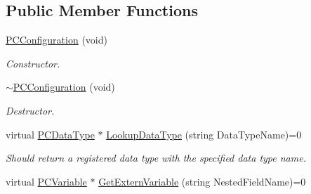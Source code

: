 \subsection*{Public Member Functions}
\begin{DoxyCompactItemize}
\item 
\hyperlink{classpc__emulator_1_1PCConfiguration_ae07e6861ec53d04f892c6bba07535c40}{P\+C\+Configuration} (void)\hypertarget{classpc__emulator_1_1PCConfiguration_ae07e6861ec53d04f892c6bba07535c40}{}\label{classpc__emulator_1_1PCConfiguration_ae07e6861ec53d04f892c6bba07535c40}

\begin{DoxyCompactList}\small\item\em Constructor. \end{DoxyCompactList}\item 
\hyperlink{classpc__emulator_1_1PCConfiguration_a0d52d8b4cca4b054e86a2d46eb4e0993}{$\sim$\+P\+C\+Configuration} (void)\hypertarget{classpc__emulator_1_1PCConfiguration_a0d52d8b4cca4b054e86a2d46eb4e0993}{}\label{classpc__emulator_1_1PCConfiguration_a0d52d8b4cca4b054e86a2d46eb4e0993}

\begin{DoxyCompactList}\small\item\em Destructor. \end{DoxyCompactList}\item 
virtual \hyperlink{classpc__emulator_1_1PCDataType}{P\+C\+Data\+Type} $\ast$ \hyperlink{classpc__emulator_1_1PCConfiguration_a432b83c94b6c378cbff6e09d9adbab71}{Lookup\+Data\+Type} (string Data\+Type\+Name)=0
\begin{DoxyCompactList}\small\item\em Should return a registered data type with the specified data type name. \end{DoxyCompactList}\item 
virtual \hyperlink{classpc__emulator_1_1PCVariable}{P\+C\+Variable} $\ast$ \hyperlink{classpc__emulator_1_1PCConfiguration_a59c7d1158449f54b369e28e22a921d0e}{Get\+Extern\+Variable} (string Nested\+Field\+Name)=0\hypertarget{classpc__emulator_1_1PCConfiguration_a59c7d1158449f54b369e28e22a921d0e}{}\label{classpc__emulator_1_1PCConfiguration_a59c7d1158449f54b369e28e22a921d0e}


\end{DoxyCompactItemize}
